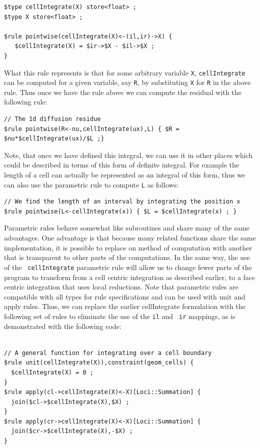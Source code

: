 \documentclass[10pt,epsf,letterpaper,twoside]{book}
\begin{document}
\begin{verbatim}
$type cellIntegrate(X) store<float> ;
$type X store<float> ;

$rule pointwise(cellIntegrate(X)<-(il,ir)->X) {
   $cellIntegrate(X) = $ir->$X - $il->$X ;
}
\end{verbatim}

What this rule represents is that for some arbitrary variable {\tt X},
{\tt cellIntegrate} can be computed for a given variable, say {\tt R},
by substituting {\tt X} for {\tt R} in the above rule.  Thus once we
have the rule above we can compute the residual with the following rule:

\begin{verbatim}
// The 1d diffusion residue
$rule pointwise(R<-nu,cellIntegrate(ux),L) { $R = $nu*$cellIntegrate(ux)/$L ;}
\end{verbatim}

Note, that once we have defined this integral, we can use it in other
places which could be described in terms of this form of definite
integral.  For example the length of a cell can actually be
represented as an integral of this form, thus we can also use the
parametric rule to compute {\tt L} as follows:

\begin{verbatim}
// We find the length of an interval by integrating the position x
$rule pointwise(L<-cellIntegrate(x)) { $L = $cellIntegrate(x) ; }
\end{verbatim}

Parametric rules behave somewhat like subroutines and share many of
the same advantages.  One advantage is that because many related
functions share the same implementation, it is possible to replace on
method of computation with another that is transparent to other parts
of the computations.  In the same way, the use of the {\tt
  cellIntegrate} parametric rule will allow us to change fewer parts
of the program to transform from a cell centric integration as
described earlier, to a face centric integration that uses local
reductions.  Note that parametric rules are compatible with all types
for rule specifications and can be used with unit and apply rules.
Thus, we can replace the earlier cellIntegrate formulation with the
following set of rules to eliminate the use of the {\tt il} and {\tt
  ir} mappings, as is demonstrated with the following code:

\begin{verbatim}

// A general function for integrating over a cell boundary
$rule unit(cellIntegrate(X)),constraint(geom_cells) {
  $cellIntegrate(X) = 0 ;
}
$rule apply(cl->cellIntegrate(X)<-X)[Loci::Summation] {
  join($cl->$cellIntegrate(X),$X) ;
}
$rule apply(cr->cellIntegrate(X)<-X)[Loci::Summation] {
  join($cr->$cellIntegrate(X),-$X) ;
}
\end{verbatim}
\end{document}
